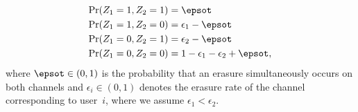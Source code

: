 \begin{subequations}
\label{eq:pmf_z1z2}
\begin{align}
	\textrm{Pr}(Z_1 = 1, Z_2 = 1) &= \epsot \\
	\textrm{Pr}(Z_1 = 1, Z_2 = 0) &= \epsilon_1 - \epsot \\
	\textrm{Pr}(Z_1 = 0, Z_2 = 1) &= \epsilon_2 - \epsot \\
	\textrm{Pr}(Z_1 = 0, Z_2 = 0) &= 1 - \epsilon_1 - \epsilon_2 + \epsot,			
\end{align}
\end{subequations}
where $\epsot\in (0, 1)$ is the probability that an erasure simultaneously occurs on both channels and $\epsilon_i \in (0, 1)$ denotes the erasure rate of the channel corresponding to user~$i$, where we assume $\epsilon_1 < \epsilon_2$.


